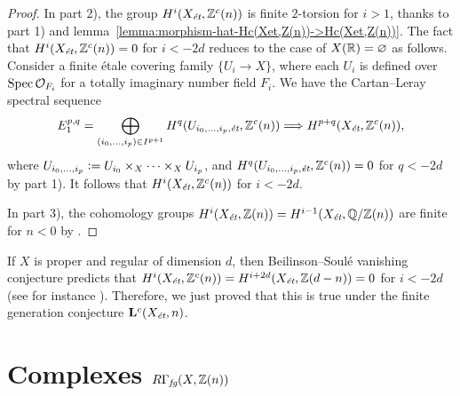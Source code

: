 \documentclass{article}
\numberwithin{equation}{section}
\begin{document}
\begin{proposition}
\begin{proof}
    In part 2), the group $H^i (X_\et, \ZZ^c (n))$ is finite $2$-torsion for
    $i > 1$, thanks to part 1) and
    lemma~\ref{lemma:morphism-hat-Hc(Xet,Z(n))->Hc(Xet,Z(n))}. The fact that
    $H^i (X_\et, \ZZ^c (n)) = 0$ for $i < -2d$ reduces to the case of
    $X (\RR) = \emptyset$ as follows. Consider a finite étale covering family
    $\{ U_i \to X \}$, where each $U_i$ is defined over
    $\Spec \mathcal{O}_{F_i}$ for a totally imaginary number field $F_i$.
    We have the Cartan--Leray spectral sequence
    \[ E_1^{p,q} = \bigoplus_{(i_0,\ldots,i_p) \in I^{p+1}} H^q (U_{i_0,\ldots,i_p, \et}, \ZZ^c (n))
      \Longrightarrow H^{p+q} (X_\et, \ZZ^c (n)), \]
    where $U_{i_0,\ldots,i_p} \dfn U_{i_0} \times_X \cdots \times_X U_{i_p}$, and
    $H^q (U_{i_0,\ldots,i_p, \et}, \ZZ^c (n)) = 0$ for $q < -2d$ by part 1).
    It follows that $H^i (X_\et, \ZZ^c (n))$ for $i < -2d$.

    In part 3), the cohomology groups
    $H^i (X_\et, \ZZ (n)) = H^{i-1} (X_\et, \QQ/\ZZ (n))$ are finite for $n < 0$
    by \cite[Theorem~3]{Kahn-2003}.
  \end{proof}
\end{proposition}

\begin{remark}
  If $X$ is proper and regular of dimension $d$, then Beilinson--Soulé
  vanishing conjecture predicts that
  $H^i (X_\et, \ZZ^c (n)) = H^{i+2d} (X_\et, \ZZ (d-n)) = 0$ for $i < -2d$
  (see for instance \cite[\S 4.3.4]{Kahn-2005}). Therefore, we just proved that
  this is true under the finite generation conjecture $\mathbf{L}^c (X_\et, n)$.
\end{remark}


\section{Complexes \texorpdfstring{$R\Gamma_\fg (X, \ZZ(n))$}{RΓ\_fg (X, ℤ(n))}}
\label{sec:RGamma-fg}
\end{document}
